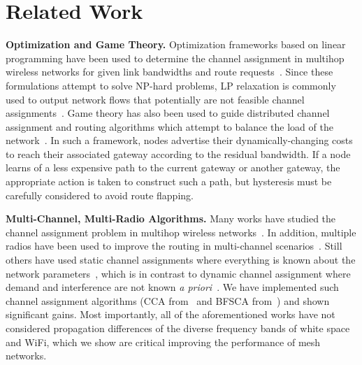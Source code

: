 \section{Related Work}
\label{sec:related}

{\bf Optimization and Game Theory.} Optimization frameworks based on linear programming
have been used to determine the channel assignment in multihop wireless networks for given 
link bandwidths and route requests~\cite{tang2005interference}.  Since these formulations 
attempt to solve NP-hard problems, LP relaxation is commonly used to output network flows 
that potentially are not feasible channel assignments~\cite{si2010overview}. 
Game theory has also been used to guide distributed channel assignment and routing 
algorithms which attempt to balance the load of the network~\cite{raniwala2005architecture,
wang2010game}.  In such a framework, nodes advertise their dynamically-changing costs 
to reach their associated gateway according to the residual bandwidth. If a node learns of
a less expensive path to the current gateway or another gateway, the appropriate action is
taken to construct such a path, but hysteresis must be carefully considered to avoid route flapping.

{\bf Multi-Channel, Multi-Radio Algorithms.} Many works have studied the channel assignment problem in multihop wireless
networks~\cite{jain2005impact,akyildiz2005wireless,raniwala2004centralized}.
In addition, multiple radios have been used to improve the routing in multi-channel
scenarios~\cite{draves2004routing}. Still others have used static channel assignments
where everything is known about the network parameters~\cite{subramanian2008minimum},
which is in contrast to dynamic channel assignment where demand and interference are 
not known {\it a priori}~\cite{wu2006analysis,ramachandran2006interference}. 
We have implemented such channel assignment algorithms (CCA from~\cite{draves2004routing} and 
BFSCA from~\cite{ramachandran2006interference}) and shown significant gains.  
Most importantly, all of the aforementioned works have not considered propagation 
differences of the diverse frequency bands of white space and WiFi, which we show are 
critical improving the performance of mesh networks.
% 
% 
%


